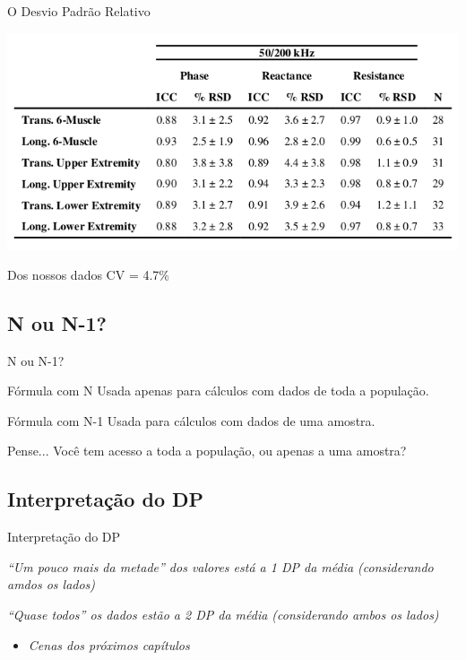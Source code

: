 \documentclass{beamer}
\begin{document}
\begin{frame}{\scriptsize O Desvio Padrão Relativo}
  \begin{center}
    \includegraphics[width=\textwidth]{Cap3/RSD1}
  \end{center}
  \begin{exampleblock}{Dos nossos dados}
    \footnotesize
    CV = 4.7\%
  \end{exampleblock}
\end{frame}

\subsection{N ou N-1?}

\begin{frame}{\scriptsize N ou N-1?}
  \begin{block}{Fórmula com N}
    \footnotesize
    Usada apenas para cálculos com dados de toda a população.
  \end{block}
  \begin{block}{Fórmula com N-1}
    \footnotesize
    Usada para cálculos com dados de uma amostra.
  \end{block}
  \begin{block}{Pense...}
    \footnotesize
      Você tem acesso a toda a população, ou apenas a uma amostra?
  \end{block}
\end{frame}

\subsection{Interpretação do DP}

\begin{frame}{\scriptsize Interpretação do DP}
  \begin{block}{}
    \footnotesize
    {\em ``Um pouco mais da metade'' dos valores está a 1 DP da média (considerando amdos os lados)}
  \end{block}
  \begin{block}{}
    \footnotesize
    {\em ``Quase todos'' os dados estão a 2 DP da média (considerando ambos os lados)}
  \end{block}
  \begin{itemize}
    \footnotesize
  \item {\em Cenas dos próximos capítulos}
  \end{itemize}
\end{frame}
\end{document}
